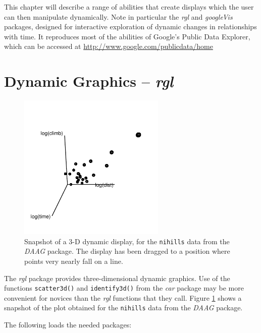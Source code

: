 \documentclass{tufte-book}\usepackage[]{graphicx}\usepackage[]{color}
\newcommand{\txtt}[1]{\texttt{#1}}
\begin{document}
This chapter will describe a range of abilities that create displays
which the user can then manipulate dynamically.  Note in particular
the {\em rgl} and {\em googleVis} packages, designed for interactive
exploration of dynamic changes in relationships with time.  It
reproduces most of the abilities of Google's Public Data Explorer,
which can be accessed at \url{http://www.google.com/publicdata/home}

\section{Dynamic Graphics -- \textit{rgl}}\label{sec:dynamicg}



\begin{figure}
\begin{Schunk}


\centerline{\includegraphics[width=0.625\textwidth]{figs/10-rgl-demo-1} }

\end{Schunk}
\caption{Snapshot of a 3-D dynamic display, for the \txtt{nihills}
data from the {\em DAAG} package.  The display has been dragged to a
position where points very nearly fall on a line.}\label{fig:rgl-ex}
\end{figure}

The \textit{rgl} package provides three-dimensional dynamic graphics.
Use of the functions \txtt{scatter3d()} and \txtt{identify3d()} from
the \emph{car} package may be more convenient for novices than the
\emph{rgl} functions that they call.
Figure \ref{fig:rgl-ex} shows a snapshot of the plot obtained for the
\txtt{nihills} data from the {\em DAAG} package.

\noindent
The following loads the needed packages:
\begin{Schunk}
\end{Schunk}
\end{document}
